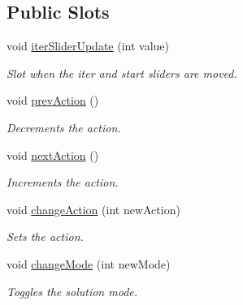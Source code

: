 \subsection*{Public Slots}
\begin{DoxyCompactItemize}
\item 
\mbox{\label{classSGPlotController__V2_a2d224cc2f5c0f0d405fb761710332ff0}} 
void \hyperlink{classSGPlotController__V2_a2d224cc2f5c0f0d405fb761710332ff0}{iter\+Slider\+Update} (int value)
\begin{DoxyCompactList}\small\item\em Slot when the iter and start sliders are moved. \end{DoxyCompactList}\item 
\mbox{\label{classSGPlotController__V2_ade8b50f8578a22e8d84a8ed959c1d692}} 
void \hyperlink{classSGPlotController__V2_ade8b50f8578a22e8d84a8ed959c1d692}{prev\+Action} ()
\begin{DoxyCompactList}\small\item\em Decrements the action. \end{DoxyCompactList}\item 
\mbox{\label{classSGPlotController__V2_a780e6182f5ac8581e3551355c22d1678}} 
void \hyperlink{classSGPlotController__V2_a780e6182f5ac8581e3551355c22d1678}{next\+Action} ()
\begin{DoxyCompactList}\small\item\em Increments the action. \end{DoxyCompactList}\item 
\mbox{\label{classSGPlotController__V2_aa22b2fa8f7fa99cd5a03554724184b96}} 
void \hyperlink{classSGPlotController__V2_aa22b2fa8f7fa99cd5a03554724184b96}{change\+Action} (int new\+Action)
\begin{DoxyCompactList}\small\item\em Sets the action. \end{DoxyCompactList}\item 
\mbox{\label{classSGPlotController__V2_aad05b4160938117e293ee78daca77da7}} 
void \hyperlink{classSGPlotController__V2_aad05b4160938117e293ee78daca77da7}{change\+Mode} (int new\+Mode)
\begin{DoxyCompactList}\small\item\em Toggles the solution mode. \end{DoxyCompactList}\end{DoxyCompactItemize}
